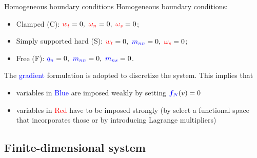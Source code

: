 \documentclass{beamer}
\begin{document}
\begin{frame}{Homogeneous boundary conditions}
Homogeneous boundary conditions:
\begin{itemize}
	\item Clamped (C): $\textcolor{red}{w_t} = 0, \ \textcolor{red}{\omega_{n}} = 0, \ \textcolor{red}{\omega_{s}}=0$;
	\item Simply supported hard (S): $\textcolor{red}{w_t} = 0, \ \textcolor{blue}{m_{nn}} = 0, \ \textcolor{red}{\omega_{s}}=0$;
	\item Free (F): $ \textcolor{blue}{q_{n}} = 0, \ \textcolor{blue}{m_{nn}}=0, \ \textcolor{blue}{m_{ns}} = 0$.
\end{itemize}
\vspace{.5cm}
The \textcolor{blue}{gradient} formulation is adopted to discretize the system. This implies that 
\begin{itemize}
\item variables in \textcolor{blue}{Blue} are imposed weakly by setting  $\textcolor{blue}{\bm{f}_N}(v) = 0$
\item variables in \textcolor{red}{Red} have to be imposed strongly (by select a functional space that incorporates those or by introducing Lagrange multipliers)
\end{itemize}
\end{frame}

\subsection{Finite-dimensional system}
\end{document}
